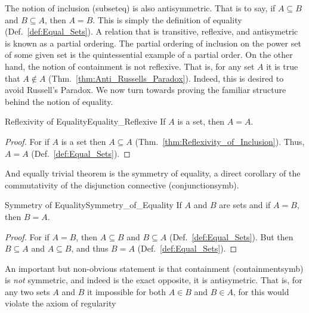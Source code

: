         The notion of inclusion (\gls{subseteq}) is also
        antisymmetric. That is to say, if
        $A\subseteq{B}$ and $B\subseteq{A}$, then $A=B$. This is simply the
        definition of equality (Def.~\ref{def:Equal_Sets}). A relation that is
        transitive, reflexive, and antisymetric is known as a partial
        ordering. The partial ordering of inclusion on the
        power set of some given set is the quintessential example of a partial
        order. On the other hand, the notion of containment is not reflexive.
        That is, for any set $A$ it is true that $A\notin{A}$
        (Thm.~\ref{thm:Anti_Russells_Paradox}). Indeed, this is desired to avoid
        Russell's Paradox. We now turn towards proving
        the familiar structure behind the notion of equality.
        \begin{ltheorem}{Reflexivity of Equality}{Equality_Reflexive}
            If $A$ is a set, then $A=A$.
        \end{ltheorem}
        \begin{proof}
            For if $A$ is a set then $A\subseteq{A}$
            (Thm.~\ref{thm:Reflexivity_of_Inclusion}). Thus, $A=A$
            (Def.~\ref{def:Equal_Sets}).
        \end{proof}
        And equally trivial theorem is the symmetry of equality, a direct
        corollary of the commutativity of the disjunction connective
        (\gls{conjunctionsymb}).
        \begin{ltheorem}{Symmetry of Equality}{Symmetry_of_Equality}
            If $A$ and $B$ are sets and if $A=B$, then $B=A$.
        \end{ltheorem}
        \begin{proof}
            For if $A=B$, then $A\subseteq{B}$ and $B\subseteq{A}$
            (Def.~\ref{def:Equal_Sets}). But then
            $B\subseteq{A}$ and $A\subseteq{B}$, and thus $B=A$
            (Def.~\ref{def:Equal_Sets}).
        \end{proof}
        An important but non-obvious statement is that containment
        (\gls{containmentsymb}) is \textit{not} symmetric, and indeed is the
        exact opposite, it is antisymetric. That is, for any two sets $A$ and
        $B$ it impossible for both $A\in{B}$ and $B\in{A}$, for this would
        violate the axiom of regularity
